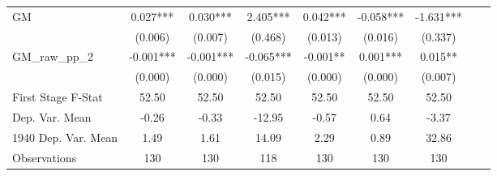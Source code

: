 \begin{tabular}{l*{8}{c}}
GM              &    0.027***&    0.030***&    2.405***&    0.042***&   -0.058***&   -1.631***\\
                &  (0.006)   &  (0.007)   &  (0.468)   &  (0.013)   &  (0.016)   &  (0.337)   \\
\addlinespace
GM\_raw\_pp\_2     &   -0.001***&   -0.001***&   -0.065***&   -0.001** &    0.001***&    0.015** \\
                &  (0.000)   &  (0.000)   &  (0.015)   &  (0.000)   &  (0.000)   &  (0.007)   \\
\midrule
First Stage F-Stat&    52.50   &    52.50   &    52.50   &    52.50   &    52.50   &    52.50   \\
Dep. Var. Mean  &    -0.26   &    -0.33   &   -12.95   &    -0.57   &     0.64   &    -3.37   \\
1940 Dep. Var. Mean&     1.49   &     1.61   &    14.09   &     2.29   &     0.89   &    32.86   \\
Observations    &      130   &      130   &      118   &      130   &      130   &      130   \\
 \bottomrule \end{tabular}
